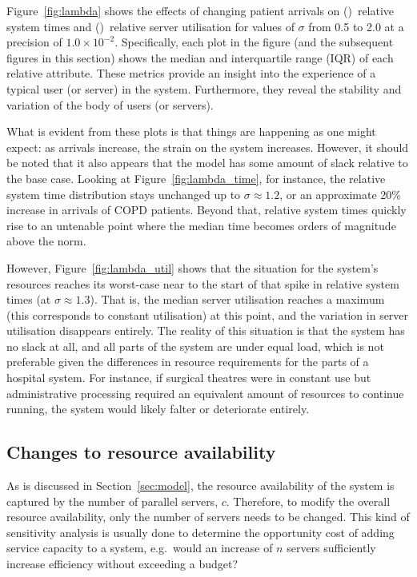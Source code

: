 \documentclass[]{interact}
\theoremstyle{plain}%
\theoremstyle{definition}
\theoremstyle{remark}
\begin{document}
Figure~\ref{fig:lambda} shows the effects of changing patient arrivals on
()~relative system times and
()~relative server utilisation for values of \(\sigma\)
from 0.5 to 2.0 at a precision of \(1.0 \times 10^{-2}\). Specifically, each
plot in the figure (and the subsequent figures in this section) shows the median
and interquartile range (IQR) of each relative attribute. These metrics provide
an insight into the experience of a typical user (or server) in the system.
Furthermore, they reveal the stability and variation of the body of users
(or servers).

What is evident from these plots is that things are happening as one might
expect: as arrivals increase, the strain on the system increases. However, it
should be noted that it also appears that the model has some amount of slack
relative to the base case. Looking at Figure~\ref{fig:lambda_time}, for
instance, the relative system time distribution stays unchanged up to \(\sigma
\approx 1.2\), or an approximate 20\% increase in arrivals of COPD patients.
Beyond that, relative system times quickly rise to an untenable point where the
median time becomes orders of magnitude above the norm.

However, Figure~\ref{fig:lambda_util} shows that the situation for the system's
resources reaches its worst-case near to the start of that spike in relative
system times (at \(\sigma \approx 1.3\)). That is, the median server utilisation
reaches a maximum (this corresponds to constant utilisation) at this point, and
the variation in server utilisation disappears entirely. The reality of this
situation is that the system has no slack at all, and all parts of the system
are under equal load, which is not preferable given the differences in resource
requirements for the parts of a hospital system. For instance, if surgical
theatres were in constant use but administrative processing required an
equivalent amount of resources to continue running, the system would likely
falter or deteriorate entirely.


\subsection{Changes to resource availability}\label{subsec:resources}

As is discussed in Section~\ref{sec:model}, the resource availability of the
system is captured by the number of parallel servers, \(c\). Therefore, to
modify the overall resource availability, only the number of servers needs to be
changed. This kind of sensitivity analysis is usually done to determine the
opportunity cost of adding service capacity to a system, e.g.\ would an increase
of \(n\) servers sufficiently increase efficiency without exceeding a budget?
\end{document}
